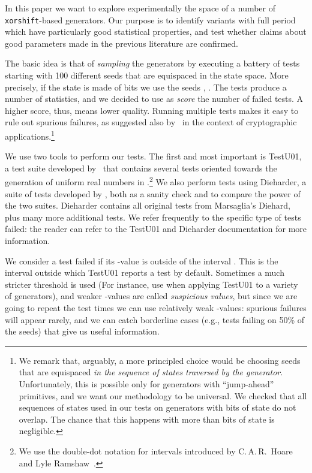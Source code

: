\documentclass{acmsmalltr}
\newcommand{\xorshift}[1][]{\texttt{xorshift#1}\xspace}
\begin{document}
In this paper we want to explore experimentally the space of a number of
\xorshift-based generators. Our purpose is to identify variants
with full period which have particularly good statistical properties, and test
whether claims about good parameters made in the previous literature are
confirmed.

The basic idea is that of \emph{sampling} the generators by executing a battery
of tests starting with 100 different seeds that are equispaced in the state
space. More precisely, if the state is made of  bits we
use the seeds , . The tests produce a
number of statistics, and we decided to use as \emph{score} the number of failed
tests. A higher score, thus, means lower quality.
Running multiple tests makes it easy to rule out spurious failures, as suggested
also by~ in the context of cryptographic
applications.\footnote{We remark that, arguably, a more principled
choice would be choosing seeds that are equispaced \emph{in the sequence of states
traversed by the generator}. Unfortunately, this is possible only for
generators with ``jump-ahead'' primitives, and we want our methodology to be
universal. We checked that all sequences of states used in our tests
on generators with  bits of state do not overlap. The chance that this
happens with more than  bits of state is negligible.}

We use two tools to perform our tests. The first and most important is
TestU01, a test suite developed by~ that
contains several tests oriented towards the generation of uniform real numbers
in .\footnote{We use the double-dot notation for intervals introduced
by C.\,A.\,R.~Hoare and Lyle Ramshaw~\cite{GKPCM}.}
We also perform tests using Dieharder, a suite of tests developed by , both as a sanity check and to compare the power of the two suites. 
Dieharder contains all original tests from Marsaglia's
Diehard, plus many more additional tests.
We refer frequently to the specific type of tests failed:
the reader can refer to the TestU01 and Dieharder documentation for more
information. 

We consider a test failed if its -value is outside of the interval
. This is the interval outside which TestU01 reports a test by
default.
Sometimes a much stricter threshold is used (For instance,
 use  when applying TestU01 to 
a variety of generators), and weaker -values are called \emph{suspicious
values}, but since we are going to repeat the
test  times we can use relatively weak -values: spurious failures will
appear rarely, and we can catch borderline cases (e.g., tests failing on 50\% of
the seeds) that give us useful information. 
\end{document}
